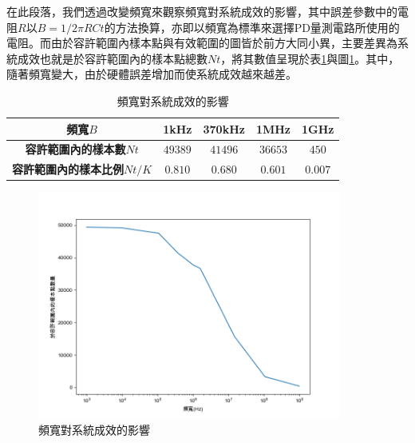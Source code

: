     在此段落，我們透過改變頻寬來觀察頻寬對系統成效的影響，其中誤差參數中的電阻$R$以$B=1/2\pi RCt$的方法換算，亦即以頻寬為標準來選擇PD量測電路所使用的電阻。而由於容許範圍內樣本點與有效範圍的圖皆於前方大同小異，主要差異為系統成效也就是於容許範圍內的樣本點總數$Nt$，將其數值呈現於表\ref{tab:bandwidth_effect}與圖\ref{pic:bandwidth_effect}。其中，隨著頻寬變大，由於硬體誤差增加而使系統成效越來越差。

    \begin{table}[htpb]
        \begin{center}
          \caption{頻寬對系統成效的影響}
          \label{tab:bandwidth_effect}
          \begin{tabular}{|c||c|c|c|c|} %
            \hline  
           \textbf{頻寬$B$} &
           1kHz&
           370kHz &
           1MHz&
           1GHz
           \\\hline\hline


           \textbf{容許範圍內的樣本數$Nt$} &
           $49389$&
           $41496$&
           $36653$&
           $450$
           \\\hline

           \textbf{容許範圍內的樣本比例$Nt/K$} &
           $0.810$&
           $0.680$&
           $0.601$&
           $0.007$
           \\\hline
         \end{tabular}
       \end{center}
     \end{table}
    
     \begin{figure}[htpb]
        \centering
        \includegraphics[width=10cm]{ch4pic/bandwidth_effect.png}
        \caption{頻寬對系統成效的影響}
        \label{pic:bandwidth_effect}
    \end{figure}




